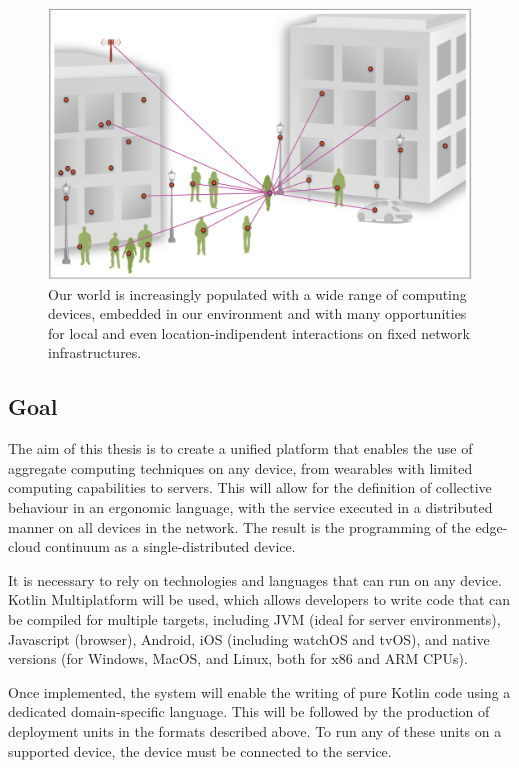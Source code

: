 \begin{figure} %
    \centering
    \includegraphics[width=.8\linewidth]{figures/smart_network_objects}
    \caption{Our world is increasingly populated with a wide range of computing devices, embedded in our environment
    and with many opportunities for local and even location-indipendent interactions on fixed network infrastructures.}
    \label{fig:smart-network-objects}
\end{figure}

\subsection{Goal}
\label{subsec:goal}

The aim of this thesis is to create a unified platform that enables the use of aggregate computing techniques on
any device, from wearables with limited computing capabilities to servers.
This will allow for the definition of collective behaviour in an ergonomic language, with the service executed in a distributed manner on all devices in the network.
The result is the programming of the edge-cloud continuum as a single-distributed device.

It is necessary to rely on technologies and languages that can run on any device.
Kotlin Multiplatform will be used, which allows developers to write code that can be compiled for multiple targets,
including JVM (ideal for server environments), Javascript (browser), Android, iOS (including watchOS and tvOS), and native versions
(for Windows, MacOS, and Linux, both for x86 and ARM CPUs).


Once implemented, the system will enable the writing of pure Kotlin code using a dedicated domain-specific language.
This will be followed by the production of deployment units in the formats described above.
To run any of these units on a supported device, the device must be connected to the service.

